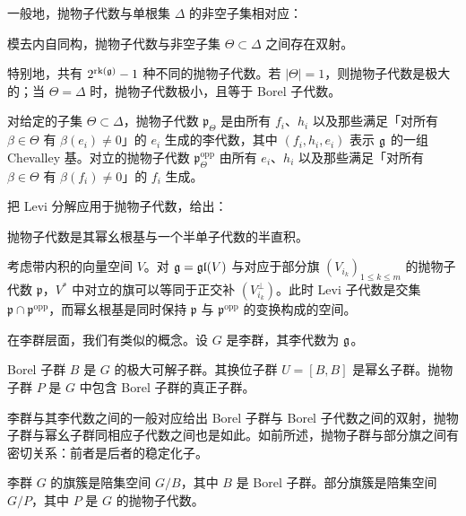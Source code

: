 一般地，抛物子代数与单根集 $\Delta$ 的非空子集相对应：

\begin{proposition}[A.37] 模去内自同构，抛物子代数与非空子集 $\Theta\subset\Delta$ 之间存在双射。
\end{proposition}

特别地，共有 $2^{\operatorname{rk}(\mathfrak{g})}-1$ 种不同的抛物子代数。若 $|\Theta|=1$，则抛物子代数是极大的；当 $\Theta=\Delta$ 时，抛物子代数极小，且等于 Borel 子代数。

对给定的子集 $\Theta\subset\Delta$，抛物子代数 $\mathfrak{p}_\Theta$ 是由所有 $f_i$、$h_i$ 以及那些满足「对所有 $\beta\in\Theta$ 有 $\beta(e_i)\ne0$」的 $e_i$ 生成的李代数，其中 $(f_i,h_i,e_i)$ 表示 $\mathfrak{g}$ 的一组 Chevalley 基。对立的抛物子代数 $\mathfrak{p}_\Theta^{\mathrm{opp}}$ 由所有 $e_i$、$h_i$ 以及那些满足「对所有 $\beta\in\Theta$ 有 $\beta(f_i)\ne0$」的 $f_i$ 生成。

把 Levi 分解应用于抛物子代数，给出：

\begin{proposition}[A.38] 抛物子代数是其幂幺根基与一个半单子代数的半直积。
\end{proposition}

\begin{example}[A.39] 考虑带内积的向量空间 $V$。对 $\mathfrak{g}=\mathfrak{gl}(V)$ 与对应于部分旗 $(V_{i_k})_{1\le k\le m}$ 的抛物子代数 $\mathfrak{p}$，$V^{*}$ 中对立的旗可以等同于正交补 $(V_{i_k}^{\perp})$。此时 Levi 子代数是交集 $\mathfrak{p}\cap\mathfrak{p}^{\mathrm{opp}}$，而幂幺根基是同时保持 $\mathfrak{p}$ 与 $\mathfrak{p}^{\mathrm{opp}}$ 的变换构成的空间。
\end{example}

在李群层面，我们有类似的概念。设 $G$ 是李群，其李代数为 $\mathfrak{g}$。


\begin{definition}[A.40] Borel 子群 $B$ 是 $G$ 的极大可解子群。其换位子群 $U=[B,B]$ 是幂幺子群。抛物子群 $P$ 是 $G$ 中包含 Borel 子群的真正子群。
\end{definition}

李群与其李代数之间的一般对应给出 Borel 子群与 Borel 子代数之间的双射，抛物子群与幂幺子群同相应子代数之间也是如此。如前所述，抛物子群与部分旗之间有密切关系：前者是后者的稳定化子。

\begin{definition}[A.41] 李群 $G$ 的旗簇是陪集空间 $G/B$，其中 $B$ 是 Borel 子群。部分旗簇是陪集空间 $G/P$，其中 $P$ 是 $G$ 的抛物子代数。
\end{definition}

